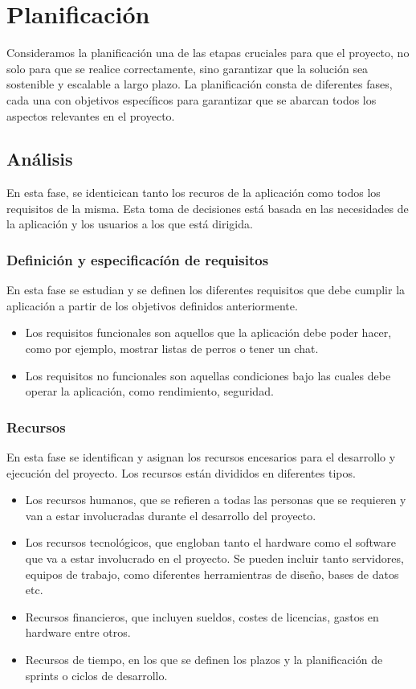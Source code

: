 \documentclass[a4paper, 12pt]{article}
\begin{document}
\newpage
\section{Planificación}

Consideramos la planificación una de las etapas cruciales para que el proyecto, no solo para que se realice correctamente, sino garantizar que la solución sea sostenible y escalable a largo plazo. La planificación consta de diferentes fases, cada una con objetivos específicos para garantizar que se abarcan todos los aspectos relevantes en el proyecto.

\subsection{Análisis}

En esta fase, se identicican tanto los recuros de la aplicación como todos los requisitos de la misma. Esta toma de decisiones está basada en las necesidades de la aplicación y los usuarios a los que está dirigida.

\subsubsection{Definición y especificacíón de requisitos}

En esta fase se estudian y se definen los diferentes requisitos que debe cumplir la aplicación a partir de los objetivos definidos anteriormente.

\begin{itemize}
	\item Los requisitos funcionales son aquellos que la aplicación debe poder hacer, como por ejemplo, mostrar listas de perros o tener un chat.
	\item Los requisitos no funcionales son aquellas condiciones bajo las cuales debe operar la aplicación, como rendimiento, seguridad.
\end{itemize}

\subsubsection{Recursos}

En esta fase se identifican y asignan los recursos encesarios para el desarrollo y ejecución del proyecto. Los recursos están divididos en diferentes tipos.
\begin{itemize}
	\item Los recursos humanos, que se refieren a todas las personas que se requieren y van a estar involucradas durante el desarrollo del proyecto.
	\item Los recursos tecnológicos, que engloban tanto el hardware como el software que va a estar involucrado en el proyecto. Se pueden incluir tanto servidores, equipos de trabajo, como diferentes herramientras de diseño, bases de datos etc.
	\item Recursos financieros, que incluyen sueldos, costes de licencias, gastos en hardware entre otros.
	\item Recursos de tiempo, en los que se definen los plazos y la planificación de sprints o ciclos de desarrollo.
\end{itemize}
\end{document}
